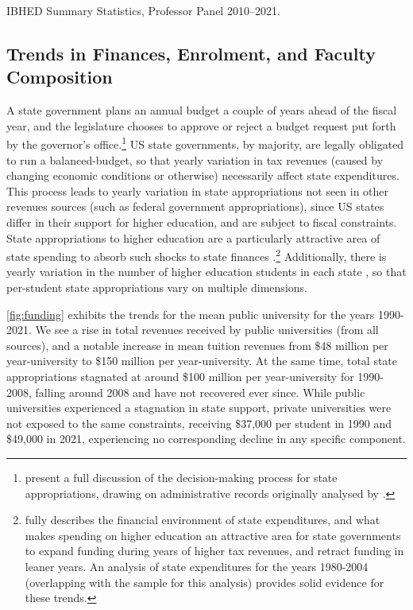 \documentclass[notitlepage,12pt]{article}
\begin{document}
\begin{table}[h!]
    \singlespacing
    \centering
    \caption{IBHED Summary Statistics, Professor Panel 2010--2021.}
    \makebox[\textwidth][c]{}
    \label{tab:illinois-summary}
\end{table}

\subsection{Trends in Finances, Enrolment, and Faculty Composition}
\label{sec:trends}
A state government plans an annual budget a couple of years ahead of the fiscal year, and the legislature chooses to approve or reject a budget request put forth by the governor's office.\footnote{
    \cite{NBERw23736} present a full discussion of the decision-making process for state appropriations, drawing on administrative records originally analysed by \cite{parmley2009state}.
}
US state governments, by majority, are legally obligated to run a balanced-budget, so that yearly variation in tax revenues (caused by changing economic conditions or otherwise) necessarily affect state expenditures.
This process leads to yearly variation in state appropriations not seen in other revenues sources (such as federal government appropriations), since US states differ in their support for higher education, and are subject to fiscal constraints.
State appropriations to higher education are a particularly attractive area of state spending to absorb such shocks to state finances \citep{delaney2011state}.\footnote{
    \cite{delaney2011state} fully describes the financial environment of state expenditures, and what makes spending on higher education an attractive area for state governments to expand funding during years of higher tax revenues, and retract funding in leaner years.
    An analysis of state expenditures for the years 1980-2004 (overlapping with the sample for this analysis) provides solid evidence for these trends.
}
Additionally, there is yearly variation in the number of higher education students in each state \citep{turner2014impact}, so that per-student state appropriations vary on multiple dimensions.

\autoref{fig:funding} exhibits the trends for the mean public university for the years 1990-2021.
We see a rise in total revenues received by public universities (from all sources), and a notable increase in mean tuition revenues from \$48 million per year-university to \$150 million per year-university.
At the same time, total state appropriations stagnated at around \$100 million per year-university for 1990-2008, falling around 2008 and have not recovered ever since.
While public universities experienced a stagnation in state support, private universities were not exposed to the same constraints, receiving \$37,000 per student in 1990 and \$49,000 in 2021, experiencing no corresponding decline in any specific component.
\end{document}
